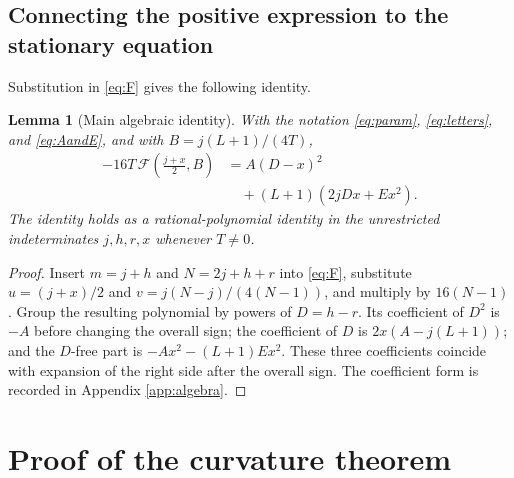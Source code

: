 \documentclass[11pt,a4paper]{article}
\newtheorem{lemma}[theorem]{Lemma}
\begin{document}
\subsection{Connecting the positive expression to the stationary equation}
Substitution in \eqref{eq:F} gives the following identity.
\begin{lemma}[Main algebraic identity]\label{lem:identity}
With the notation \eqref{eq:param}, \eqref{eq:letters}, and \eqref{eq:AandE}, and with $B=j(L+1)/(4T)$,
\begin{equation}\label{eq:exactidentity}
 \boxed{\begin{aligned}
 -16T\,\mathcal F\left(\frac{j+x}{2},B\right)
 & =A(D-x)^2\\
 &\quad+(L+1)(2jDx+Ex^2).
 \end{aligned}}
\end{equation}
The identity holds as a rational-polynomial identity in the unrestricted indeterminates $j,h,r,x$ whenever $T\ne0$.
\end{lemma}
\begin{proof}
Insert $m=j+h$ and $N=2j+h+r$ into \eqref{eq:F}, substitute $u=(j+x)/2$ and $v=j(N-j)/(4(N-1))$, and multiply by $16(N-1)$. Group the resulting polynomial by powers of $D=h-r$. Its coefficient of $D^2$ is $-A$ before changing the overall sign; the coefficient of $D$ is $2x(A-j(L+1))$; and the $D$-free part is $-Ax^2-(L+1)Ex^2$. These three coefficients coincide with expansion of the right side after the overall sign. The coefficient form is recorded in Appendix \ref{app:algebra}.
\end{proof}

\section{Proof of the curvature theorem}\label{sec:proof}
\end{document}
